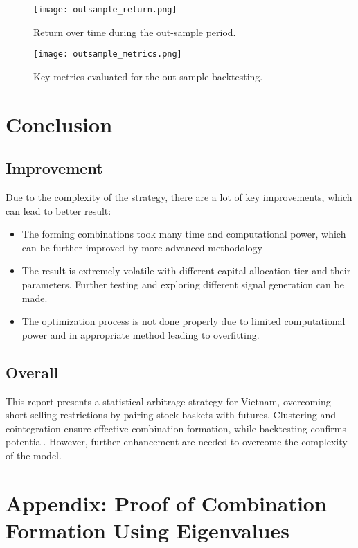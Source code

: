 \documentclass[a4paper,12pt]{article}
\begin{document}
\begin{figure}[h!]
    \centering
    \texttt{[image: outsample\_return.png]}
    \caption{Return over time during the out-sample period.}
    \label{fig:return_over_time}
\end{figure}


\begin{figure}[h!]
    \centering
    \texttt{[image: outsample\_metrics.png]}
    \caption{Key metrics evaluated for the out-sample backtesting.}
    \label{fig:key_metrics}
\end{figure}
\clearpage

\section{Conclusion}
\subsection{Improvement}
Due to the complexity of the strategy, there are a lot of key improvements, which can lead to better result:
\begin{itemize}
    \item The forming combinations took many time and computational power, which can be further improved by more advanced methodology
    \item The result is extremely volatile with different capital-allocation-tier and their parameters. Further testing and exploring different signal generation can be made.
    \item The optimization process is not done properly due to limited computational power and in appropriate method leading to overfitting.
\end{itemize}
\subsection{Overall}
This report presents a statistical arbitrage strategy for Vietnam, overcoming short-selling restrictions by pairing stock baskets with futures. Clustering and cointegration ensure effective combination formation, while backtesting confirms potential. However, further enhancement are needed to overcome the complexity of the model.
\clearpage
\section{Appendix: Proof of Combination Formation Using Eigenvalues}
\label{app:proof}
\end{document}
